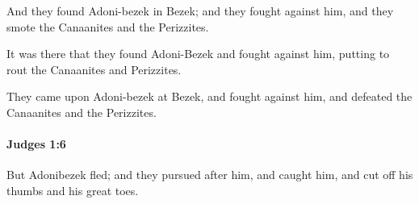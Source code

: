 			\begin{versebox}
					\item[BHS] 
					\item[ASV] And they found Adoni-bezek in Bezek; and they fought against him, and they smote the Canaanites and the Perizzites.
					\item[NIV] It was there that they found Adoni-Bezek and fought against him, putting to rout the Canaanites and Perizzites.
					\item[NRSV] They came upon Adoni-bezek at Bezek, and fought against him, and defeated the Canaanites and the Perizzites.
			\end{versebox}

		\paragraph{Judges 1:6} %
			\label{JUDGES-1-6}

			But Adonibezek fled; and they pursued after him, and caught him, and cut off his thumbs and his great toes.

